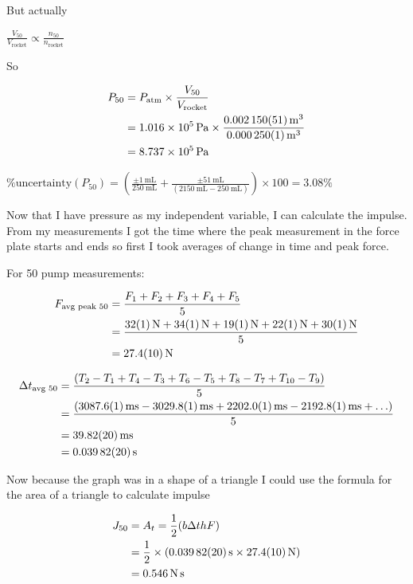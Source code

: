 \documentclass[12pt,a4paper]{article}
\begin{document}
But actually

$\frac{V_{50}}{V_{\text{rocket}}} \propto \frac{n_{50}}{n_{\text{rocket}}}$

So

\begin{align}
P_{50} &= P_{\text{atm}} \times \frac{V_{50}}{V_{\text{rocket}}} \\
&= \SI{1.016e5}{\pascal} \times \frac{\SI{0.002150 \pm 0.000051}{\meter\cubed}}{\SI{0.000250 \pm 0.000001}{\meter\cubed}} \\
&= \SI{8.737e5}{\pascal}
\end{align}

$\%\text{uncertainty}(P_{50}) = \left(\frac{\pm \SI{1}{\milli\liter}}{\SI{250}{\milli\liter}} + \frac{\pm \SI{51}{\milli\liter}}{(\SI{2150}{\milli\liter} - \SI{250}{\milli\liter})}\right) \times 100 = 3.08\%$

Now that I have pressure as my independent variable, I can calculate the impulse. From my measurements I got the time where the peak measurement in the force plate starts and ends so first I took averages of change in time and peak force.

For 50 pump measurements:

\begin{align}
F_{\text{avg peak 50}} &= \frac{F_1 + F_2 + F_3 + F_4 + F_5}{5} \\
&= \frac{\SI{32 \pm 1}{\newton} + \SI{34 \pm 1}{\newton} + \SI{19 \pm 1}{\newton} + \SI{22 \pm 1}{\newton} + \SI{30 \pm 1}{\newton}}{5} \\
&= \SI{27.4 \pm 1}{\newton}
\end{align}

\begin{align}
\Delta t_{\text{avg 50}} &= \frac{(T_2 - T_1 + T_4 - T_3 + T_6 - T_5 + T_8 - T_7 + T_{10} - T_9)}{5} \\
&= \frac{(\SI{3087.6 \pm 0.1}{\milli\second} - \SI{3029.8 \pm 0.1}{\milli\second} + \SI{2202.0 \pm 0.1}{\milli\second} - \SI{2192.8 \pm 0.1}{\milli\second} + \ldots)}{5} \\
&= \SI{39.82 \pm 0.2}{\milli\second} \\
&= \SI{0.03982 \pm 0.0002}{\second}
\end{align}

Now because the graph was in a shape of a triangle I could use the formula for the area of a triangle to calculate impulse

\begin{align}
J_{50} &= A_t = \frac{1}{2}(b\Delta t h F) \\
&= \frac{1}{2} \times (\SI{0.03982 \pm 0.0002}{\second} \times \SI{27.4 \pm 1}{\newton}) \\
&= \SI{0.546}{\newton\second}
\end{align}
\end{document}
